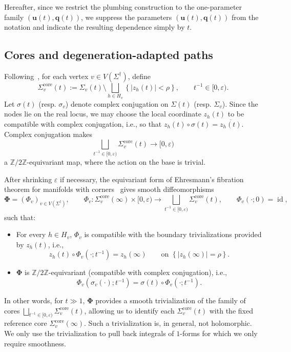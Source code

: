 \documentclass[12pt]{amsart}
\numberwithin{equation}{section}
\theoremstyle{definition}
\newcommand{\Z}{\mathbb{Z}}
\def\vertices{V}
\def\trop{\dagger}
\def\mcurve{\Sigma}
\def\tropmcurve{\mcurve^\trop}
\begin{document}
Hereafter, since we restrict the plumbing construction to the one-parameter family $(\bm u(t),\bm q(t))$, we suppress the parameters $(\bm u(t),\bm q(t))$ from the notation and indicate the resulting dependence simply by $t$.


\subsection{Cores and degeneration-adapted paths}
\label{sec:tropicalization_of_paths}

Following~\cite[Proof of Theorem~3.6]{HubbardKoch}, for each vertex
$v\in\vertices(\tropmcurve)$, define
\[
\mcurve_v^{\mathrm{core}}(t)
:=
\mcurve_v(t)
\setminus
\bigsqcup_{h\in H_v}
\left\{
|z_h(t)|<\rho
\right\},
\qquad t^{-1}\in[0,\varepsilon).
\]
Let $\sigma(t)$ (resp. $\sigma_v$) denote complex conjugation on $\mcurve(t)$ (resp. $\mcurve_v$). Since the nodes lie on the real locus, we may choose the local coordinate $z_h(t)$ to be compatible with complex conjugation, i.e., so that $z_h(t) \circ \sigma(t) = \overline{z_h(t)}$. Complex conjugation makes 
\[
\bigsqcup_{t^{-1}\in[0,\varepsilon)}
\mcurve_v^{\mathrm{core}}(t)
\rightarrow
[0,\varepsilon)
\]
a $\Z/2\Z$-equivariant map, where the action on the base is trivial.

After shrinking $\varepsilon$ if necessary,
the equivariant form of Ehresmann's fibration theorem for manifolds
with corners~\cite[Lemma~2.34]{GoodwillieIgusaMalkiewichMerling} gives smooth diffeomorphisms
\begin{equation}\label{eq:trivialization}
\bm \Phi = (\Phi_v)_{v \in \vertices(\tropmcurve)},\qquad \Phi_v:
\mcurve_v^{\mathrm{core}}(\infty)\times[0,\varepsilon)
\rightarrow
\bigsqcup_{t^{-1}\in[0,\varepsilon)}
\mcurve_v^{\mathrm{core}}(t),
\qquad
\Phi_v(\cdot;0)=\operatorname{id},
\end{equation}
such that:
\begin{itemize}
\item For every $h\in H_v$, $\Phi_v$ is compatible with the boundary trivializations provided by $z_h(t)$, i.e., 
\[
z_h(t)\circ\Phi_{v}(\cdot;t^{-1})
=
z_h(\infty)
\qquad
\text{on }
\left\{
|z_h(\infty)|=\rho
\right\}.
\]
\item $\bm \Phi$ is $\Z/2\Z$-equivariant (compatible with complex conjugation), i.e., 
\[
\Phi_v(\sigma_v(\cdot);t^{-1})= \sigma(t) \circ \Phi_v(\cdot;t^{-1}).
\]
\end{itemize}
In other words, for $t\gg1$, $\bm \Phi$ provides a smooth trivialization of the family of cores $\bigsqcup_{t^{-1}\in[0,\varepsilon)} \mcurve_v^{\mathrm{core}}(t)$, allowing us to identify each $\mcurve_v^{\mathrm{core}}(t)$ with the fixed reference core $\mcurve_v^{\mathrm{core}}(\infty)$. Such a trivialization is, in general, not holomorphic. We only use the trivialization to pull back integrals of $1$-forms for which we only require smoothness.
\end{document}
